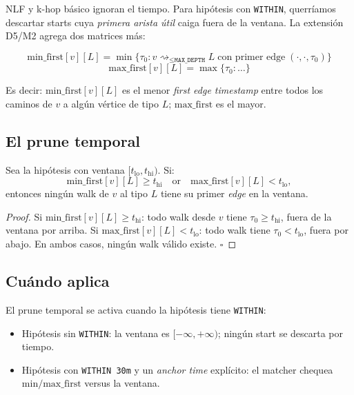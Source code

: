NLF y k-hop básico ignoran el tiempo. Para hipótesis con
\texttt{WITHIN}, querríamos descartar starts cuya \emph{primera
arista útil} caiga fuera de la ventana. La extensión D5/M2 agrega
dos matrices más:

\begin{definition}
\[
\mathrm{min\_first}[v][L] = \min \{\tau_0 : v \rightsquigarrow_{\leq \texttt{MAX\_DEPTH}} L\;\text{con primer edge}\;(\cdot,\cdot,\tau_0)\}
\]
\[
\mathrm{max\_first}[v][L] = \max \{\tau_0 : \dots\}
\]
\end{definition}

\noindent
Es decir: \(\mathrm{min\_first}[v][L]\) es el menor \emph{first edge
timestamp} entre todos los caminos de \(v\) a algún vértice de tipo
\(L\); \(\mathrm{max\_first}\) es el mayor.

\subsection{El prune temporal}

\begin{theorem}
Sea la hipótesis con ventana
\([t_{\mathrm{lo}}, t_{\mathrm{hi}})\). Si:
\[
\mathrm{min\_first}[v][L] \geq t_{\mathrm{hi}} \quad \text{or} \quad
\mathrm{max\_first}[v][L] < t_{\mathrm{lo}},
\]
entonces ningún walk de \(v\) al tipo \(L\) tiene su primer
\emph{edge} en la ventana.
\end{theorem}

\begin{proof}
Si \(\mathrm{min\_first}[v][L] \geq t_{\mathrm{hi}}\): todo walk
desde \(v\) tiene \(\tau_0 \geq t_{\mathrm{hi}}\), fuera de la
ventana por arriba. Si \(\mathrm{max\_first}[v][L] < t_{\mathrm{lo}}\):
todo walk tiene \(\tau_0 < t_{\mathrm{lo}}\), fuera por abajo.
En ambos casos, ningún walk válido existe. \(\square\)
\end{proof}

\subsection{Cuándo aplica}

El prune temporal se activa cuando la hipótesis tiene
\texttt{WITHIN}:

\begin{itemize}
    \item Hipótesis sin \texttt{WITHIN}: la ventana es
    \([-\infty, +\infty)\); ningún start se descarta por tiempo.
    \item Hipótesis con \texttt{WITHIN 30m} y un \emph{anchor time}
    explícito: el matcher chequea \(\mathrm{min/max\_first}\)
    versus la ventana.
\end{itemize}

